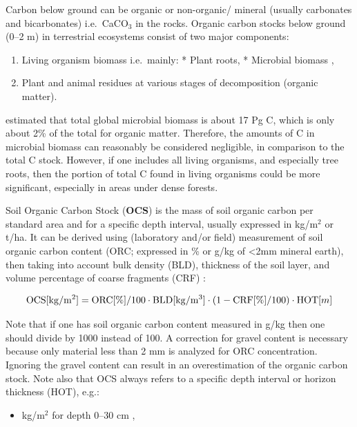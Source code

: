 \documentclass[graybox,natbib,nospthms,UStrade]{svmono}
\providecommand{\tightlist}{%
  \setlength{\itemsep}{0pt}\setlength{\parskip}{0pt}}
\providecommand{\tightlist}{\setlength{\itemsep}{0pt}\setlength{\parskip}{0pt}}
\begin{document}
Carbon below ground can be organic or non-organic/ mineral (usually carbonates and bicarbonates) i.e.~CaCO\(_3\) in the rocks. Organic carbon stocks below ground (0--2 m) in terrestrial ecosystems consist of two major components:

\begin{enumerate}
\def\labelenumi{\arabic{enumi}.}
\tightlist
\item
  Living organism biomass i.e.~mainly:
  * Plant roots,
  * Microbial biomass \citep{xu2013global},
\item
  Plant and animal residues at various stages of decomposition (organic matter).
\end{enumerate}

\citet{xu2013global} estimated that total global microbial biomass is about 17 Pg C, which is only about 2\% of the total for organic matter. Therefore, the amounts of C in microbial biomass can reasonably be considered negligible, in comparison to the total C stock. However, if one includes all living organisms, and especially tree roots, then the portion of total C found in living organisms could be more significant, especially in areas under dense forests.

Soil Organic Carbon Stock (\textbf{OCS}) is the mass of soil organic carbon per standard area and for a specific depth interval, usually expressed in kg/m\(^2\) or t/ha. It can be derived using (laboratory and/or field) measurement of soil organic carbon content (ORC; expressed in \% or g/kg of \textless{}2mm mineral earth), then taking into account bulk density (BLD), thickness of the soil layer, and volume percentage of coarse fragments (CRF) \citep{Nelson1982, poeplau2017soil}:

\begin{equation}
{\rm OCS} [{\rm kg/m^2}] = {\rm ORC} [\%] / 100 \cdot {\rm BLD} [{\rm kg/m^3}] \cdot (1- {\rm CRF} [\%]/100) \cdot {\rm HOT} [m]
\label{eq:ocs}
\end{equation}

Note that if one has soil organic carbon content measured in g/kg then one should divide by 1000 instead of 100. A correction for gravel content is necessary because only material less than 2 mm is analyzed for ORC concentration. Ignoring the gravel content can result in an overestimation of the organic carbon stock. Note also that OCS always refers to a specific depth interval or horizon thickness (HOT), e.g.:

\begin{itemize}
\tightlist
\item
  kg/m\(^2\) for depth 0--30 cm \citep{berhongaray2013ipcc},
\end{itemize}
\end{document}
